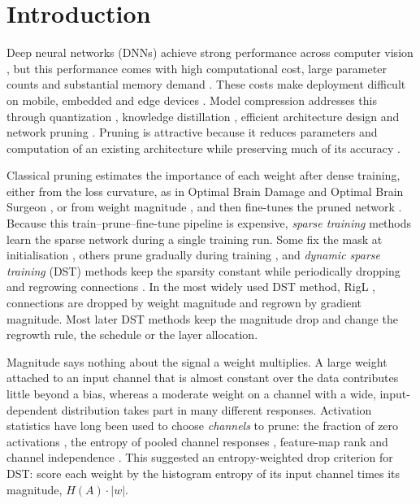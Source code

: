 \section{Introduction}
\label{sec:intro}

Deep neural networks (DNNs) achieve strong performance across computer vision \cite{he2016deep,dosovitskiy2020image}, but this performance comes with high computational cost, large parameter counts and substantial memory demand \cite{hoefler2021sparsity}. These costs make deployment difficult on mobile, embedded and edge devices \cite{howard2017mobilenets,ma2018shufflenet}. Model compression addresses this through quantization \cite{jacob2018quantization}, knowledge distillation \cite{hinton2015distilling}, efficient architecture design \cite{tan2019efficientnet} and network pruning \cite{han2015learning,blalock2020state}. Pruning is attractive because it reduces parameters and computation of an existing architecture while preserving much of its accuracy \cite{liu2018rethinking}.

Classical pruning estimates the importance of each weight after dense training, either from the loss curvature, as in Optimal Brain Damage and Optimal Brain Surgeon \cite{lecun1989optimal,hassibi1992second}, or from weight magnitude \cite{han2015learning}, and then fine-tunes the pruned network \cite{liu2017learning}. Because this train--prune--fine-tune pipeline is expensive, \emph{sparse training} methods learn the sparse network during a single training run. Some fix the mask at initialisation \cite{lee2018snip,wang2020picking,tanaka2020synflow}, others prune gradually during training \cite{zhu2017prune,sanh2020movement}, and \emph{dynamic sparse training} (DST) methods keep the sparsity constant while periodically dropping and regrowing connections \cite{mocanu2018scalable,bellec2017deep,mostafa2019parameter,dettmers2019sparse,evci2020rigging}. In the most widely used DST method, RigL \cite{evci2020rigging}, connections are dropped by weight magnitude and regrown by gradient magnitude. Most later DST methods keep the magnitude drop and change the regrowth rule, the schedule or the layer allocation.

Magnitude says nothing about the signal a weight multiplies. A large weight attached to an input channel that is almost constant over the data contributes little beyond a bias, whereas a moderate weight on a channel with a wide, input-dependent distribution takes part in many different responses. Activation statistics have long been used to choose \emph{channels} to prune: the fraction of zero activations \cite{hu2016network}, the entropy of pooled channel responses \cite{luo2017entropy}, feature-map rank \cite{lin2020hrank} and channel independence \cite{sui2021chip}. This suggested an entropy-weighted drop criterion for DST: score each weight by the histogram entropy of its input channel times its magnitude, $H(A)\cdot|w|$.

